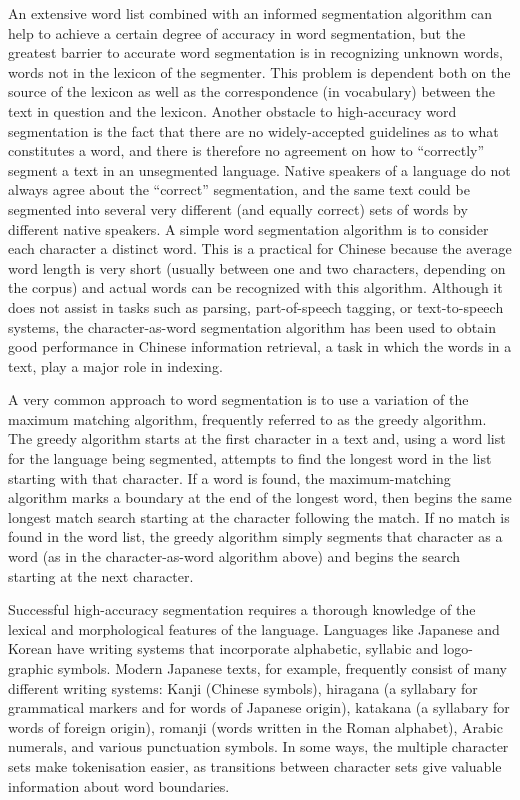 \documentclass[runningheads]{llncs}
\begin{document}
An extensive word list combined with an informed segmentation algorithm can help to achieve a certain degree of accuracy in word segmentation, but the greatest barrier to accurate word segmentation is in recognizing unknown words, words not in the lexicon of the segmenter. This problem is dependent both on the source of the lexicon as well as the correspondence (in vocabulary) between the text in question and the lexicon. Another obstacle to high-accuracy word segmentation is the fact that there are no widely-accepted guidelines as to what constitutes a word, and there is therefore no agreement on how to “correctly” segment a text in an unsegmented language. Native speakers of a language do not always agree about the “correct” segmentation, and the same text could be segmented into several very different (and equally correct) sets of words by different native speakers. A simple word segmentation algorithm is to consider each character a distinct word. This is a practical for Chinese because the average word length is very short (usually between one and two characters, depending on the corpus) and actual words can be recognized with this algorithm. Although it does not assist in tasks such as parsing, part-of-speech tagging, or text-to-speech systems, the character-as-word segmentation algorithm has been used to obtain good performance in Chinese information retrieval, a task in which the words in a text, play a major role in indexing.

A very common approach to word segmentation is to use a variation of the maximum matching algorithm, frequently referred to as the greedy algorithm. 
The greedy algorithm starts at the first character in a text and, using a word list for the language being segmented, attempts to find the longest word in the list starting with that character. If a word is found, the maximum-matching algorithm marks a boundary at the end of the longest word, then begins the same longest match search starting at the character following the match.
If no match is found in the word list, the greedy algorithm simply segments that character as a word (as in the character-as-word algorithm above) and begins the search starting at the next character. 

Successful high-accuracy segmentation requires a thorough knowledge of the lexical and morphological features of the language. Languages like Japanese and Korean have writing systems that incorporate alphabetic, syllabic and logo-graphic symbols. Modern Japanese texts, for example, frequently consist of many different writing systems: Kanji (Chinese symbols), hiragana (a syllabary for grammatical markers and for words of Japanese origin), katakana (a syllabary for words of foreign origin), romanji (words written in the Roman alphabet), Arabic numerals, and various punctuation symbols. 
In some ways, the multiple character sets make tokenisation easier, as transitions between character sets give valuable information about word boundaries.
\end{document}
